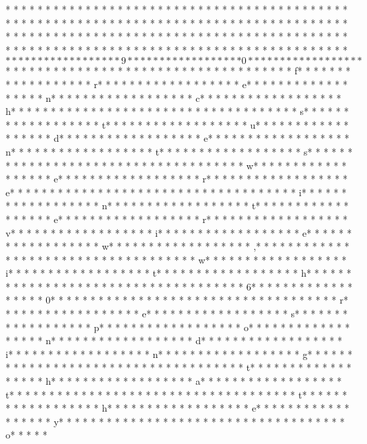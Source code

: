* * *  * * *  * * *  *  * * *  *  * * *  * * *  * * *  *  * * *  *  * * *  * * *  * * *  *  * * *  *  * * *  *  * * *  * * *  * * *  *  * * *  *  * * *  *  * * *  * * *  * * *  *  * * *  *  * * *  *  * * *  * * *  * * *  *  * * *  *  * * *  *  * * *  * * *  * * *  *  * * *  *  * * *  *  * * *  * * *  * * *  *  * * *  *  * * *  *  * * *  * * *  * * *  *  * * *  *  * * *  *  * * *  * * *  * * *  *  * * *  *  * * *  * $* * *  * * *  * * *  *  * * *  *  * * *  * 9* * *  * * *  * * *  *  * * *  *  * * *  * 0* * *  * * *  * * *  *  * * *  *  * * *  * $* * *  * * *  * * *  *  * * *  *  * * *  *  * * *  * * *  * * *  *  * * *  *  * * *  * f* * *  * * *  * * *  *  * * *  *  * * *  * r* * *  * * *  * * *  *  * * *  *  * * *  * e* * *  * * *  * * *  *  * * *  *  * * *  * n* * *  * * *  * * *  *  * * *  *  * * *  * c* * *  * * *  * * *  *  * * *  *  * * *  * h* * *  * * *  * * *  *  * * *  *  * * *  *  * * *  * * *  * * *  *  * * *  *  * * *  * s* * *  * * *  * * *  *  * * *  *  * * *  * t* * *  * * *  * * *  *  * * *  *  * * *  * u* * *  * * *  * * *  *  * * *  *  * * *  * d* * *  * * *  * * *  *  * * *  *  * * *  * e* * *  * * *  * * *  *  * * *  *  * * *  * n* * *  * * *  * * *  *  * * *  *  * * *  * t* * *  * * *  * * *  *  * * *  *  * * *  * s* * *  * * *  * * *  *  * * *  *  * * *  *  * * *  * * *  * * *  *  * * *  *  * * *  * w* * *  * * *  * * *  *  * * *  *  * * *  * e* * *  * * *  * * *  *  * * *  *  * * *  * r* * *  * * *  * * *  *  * * *  *  * * *  * e* * *  * * *  * * *  *  * * *  *  * * *  *  * * *  * * *  * * *  *  * * *  *  * * *  * i* * *  * * *  * * *  *  * * *  *  * * *  * n* * *  * * *  * * *  *  * * *  *  * * *  * t* * *  * * *  * * *  *  * * *  *  * * *  * e* * *  * * *  * * *  *  * * *  *  * * *  * r* * *  * * *  * * *  *  * * *  *  * * *  * v* * *  * * *  * * *  *  * * *  *  * * *  * i* * *  * * *  * * *  *  * * *  *  * * *  * e* * *  * * *  * * *  *  * * *  *  * * *  * w* * *  * * *  * * *  *  * * *  *  * * *  * ,* * *  * * *  * * *  *  * * *  *  * * *  *  * * *  * * *  * * *  *  * * *  *  * * *  * w* * *  * * *  * * *  *  * * *  *  * * *  * i* * *  * * *  * * *  *  * * *  *  * * *  * t* * *  * * *  * * *  *  * * *  *  * * *  * h* * *  * * *  * * *  *  * * *  *  * * *  *  * * *  * * *  * * *  *  * * *  *  * * *  * 6* * *  * * *  * * *  *  * * *  *  * * *  * 0* * *  * * *  * * *  *  * * *  *  * * *  *  * * *  * * *  * * *  *  * * *  *  * * *  * r* * *  * * *  * * *  *  * * *  *  * * *  * e* * *  * * *  * * *  *  * * *  *  * * *  * s* * *  * * *  * * *  *  * * *  *  * * *  * p* * *  * * *  * * *  *  * * *  *  * * *  * o* * *  * * *  * * *  *  * * *  *  * * *  * n* * *  * * *  * * *  *  * * *  *  * * *  * d* * *  * * *  * * *  *  * * *  *  * * *  * i* * *  * * *  * * *  *  * * *  *  * * *  * n* * *  * * *  * * *  *  * * *  *  * * *  * g* * *  * * *  * * *  *  * * *  *  * * *  *  * * *  * * *  * * *  *  * * *  *  * * *  * t* * *  * * *  * * *  *  * * *  *  * * *  * h* * *  * * *  * * *  *  * * *  *  * * *  * a* * *  * * *  * * *  *  * * *  *  * * *  * t* * *  * * *  * * *  *  * * *  *  * * *  *  * * *  * * *  * * *  *  * * *  *  * * *  * t* * *  * * *  * * *  *  * * *  *  * * *  * h* * *  * * *  * * *  *  * * *  *  * * *  * e* * *  * * *  * * *  *  * * *  *  * * *  * y* * *  * * *  * * *  *  * * *  *  * * *  *  * * *  * * *  * * *  *  * * *  *  * * *  * o* * *  * * 